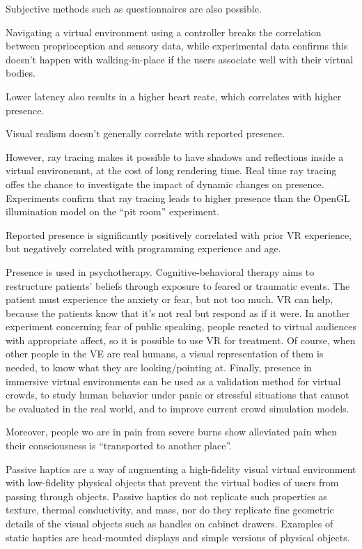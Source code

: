 \documentclass[a4paper]{article}
\begin{document}
Subjective methods such as questionnaires are also possible.

Navigating a virtual environment using a controller breaks the
correlation between proprioception and sensory data, while experimental
data confirms this doesn't happen with walking-in-place if the users
associate well with their virtual bodies.

Lower latency also results in a higher heart reate, which correlates
with higher presence.

Visual realism doesn't generally correlate with reported presence.

However, ray tracing makes it possible to have shadows and reflections
inside a virtual environemnt, at the cost of long rendering time.
Real
time ray tracing offes the chance to investigate the impact of dynamic
changes on presence.
Experiments confirm that ray tracing leads to
higher presence than the OpenGL illumination model on the ``pit room''
experiment.

Reported presence is significantly positively correlated with prior VR
experience, but negatively correlated with programming experience and
age.

Presence is used in psychotherapy.
Cognitive-behavioral therapy aims to
restructure patients' beliefs through exposure to feared or traumatic
events.
The patient must experience the anxiety or fear, but not too
much.
VR can help, because the patients know that it's not real but
respond as if it were.
In another experiment concerning fear of public
speaking, people reacted to virtual audiences with appropriate affect,
so it is possible to use VR for treatment.
Of course, when other people
in the VE are real humans, a visual representation of them is needed, to
know what they are looking/pointing at.
Finally, presence in immersive
virtual environments can be used as a validation method for virtual
crowds, to study human behavior under panic or stressful situations that
cannot be evaluated in the real world, and to improve current crowd
simulation models.

Moreover, people wo are in pain from severe burns show alleviated pain
when their consciousness is ``transported to another place''.

Passive haptics are a way of augmenting a high-fidelity visual virtual
environment with low-fidelity physical objects that prevent the virtual
bodies of users from passing through objects.
Passive haptics do not
replicate such properties as texture, thermal conductivity, and mass,
nor do they replicate fine geometric details of the visual objects such
as handles on cabinet drawers.
Examples of static haptics are
head-mounted displays and simple versions of physical objects.
\end{document}
